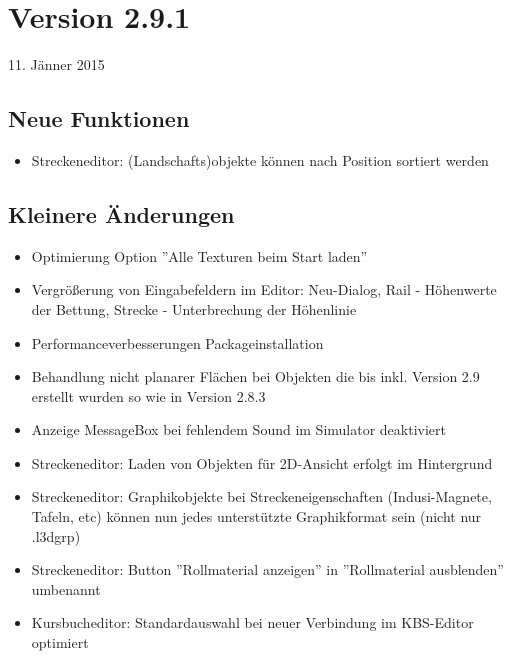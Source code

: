 \section{Version 2.9.1}\hfill 11. Jänner 2015

\subsection{Neue Funktionen}
\begin{itemize}
\item Streckeneditor: (Landschafts)objekte können nach Position sortiert werden
\end{itemize}

\subsection{Kleinere Änderungen}
\begin{itemize}
\item Optimierung Option ''Alle Texturen beim Start laden''
\item Vergrößerung von Eingabefeldern im Editor: Neu-Dialog, Rail - Höhenwerte der Bettung, Strecke - Unterbrechung der Höhenlinie
\item Performanceverbesserungen Packageinstallation
\item Behandlung nicht planarer Flächen bei Objekten die bis inkl. Version 2.9 erstellt wurden so wie in Version 2.8.3
\item Anzeige MessageBox bei fehlendem Sound im Simulator deaktiviert

\item Streckeneditor: Laden von Objekten für 2D-Ansicht erfolgt im Hintergrund
\item Streckeneditor: Graphikobjekte bei Streckeneigenschaften (Indusi-Magnete, Tafeln, etc) können nun jedes unterstützte Graphikformat sein (nicht nur .l3dgrp)
\item Streckeneditor: Button ''Rollmaterial anzeigen'' in ''Rollmaterial ausblenden'' umbenannt

\item Kursbucheditor: Standardauswahl bei neuer Verbindung im KBS-Editor optimiert
\end{itemize}

